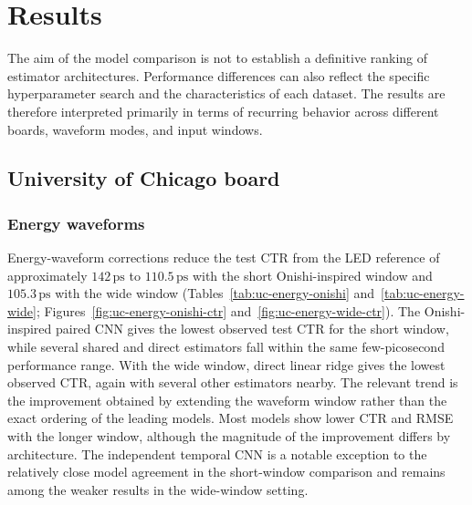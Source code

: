 \section{Results}
\label{sec:results-tables}

The aim of the model comparison is not to establish a definitive ranking 
of estimator architectures. Performance differences can also reflect 
the specific hyperparameter search and the characteristics of each dataset. 
The results are therefore interpreted primarily in terms of recurring 
behavior across different boards, waveform modes, and input windows.

\subsection{University of Chicago board}

\subsubsection{Energy waveforms}
Energy-waveform corrections reduce the test CTR from the LED reference of
approximately $142\,\mathrm{ps}$ to $110.5\,\mathrm{ps}$ with the short
Onishi-inspired window and $105.3\,\mathrm{ps}$ with the wide window
(Tables~\ref{tab:uc-energy-onishi} and~\ref{tab:uc-energy-wide};
Figures~\ref{fig:uc-energy-onishi-ctr} and~\ref{fig:uc-energy-wide-ctr}).
The Onishi-inspired paired CNN gives the lowest observed test CTR for the
short window, while several shared and direct estimators fall within the
same few-picosecond performance range. With the wide window, direct
linear ridge gives the lowest observed CTR, again with several other
estimators nearby. The relevant trend is the improvement obtained by
extending the waveform window rather than the exact ordering of the
leading models. Most models show lower CTR and RMSE with the longer
window, although the magnitude of the improvement differs by architecture.
The independent temporal CNN is a notable exception to the relatively
close model agreement in the short-window comparison and remains among
the weaker results in the wide-window setting.




